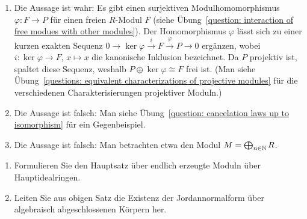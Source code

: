 \begin{solution}
\begin{enumerate}
    \item
      Die Aussage ist wahr:
      Es gibt einen surjektiven Modulhomomorphismus $\varphi \colon F \to P$ für einen freien $R$-Modul $F$ (siehe Übung~\ref{question: interaction of free modues with other modules}).
      Der Homomorphismus $\varphi$ lässt sich zu einer kurzen exakten Sequenz $0 \to \ker \varphi \xrightarrow{i} F \xrightarrow{\varphi} P \to 0$ ergänzen, wobei $i \colon \ker \varphi \to F$, $x \mapsto x$ die kanonische Inklusion bezeichnet.
      Da $P$ projektiv ist, spaltet diese Sequenz, weshalb $P \oplus \ker \varphi \cong F$ frei ist.
      (Man siehe Übung~\ref{questions: equivalent characterizations of projective modules} für die verschiedenen Charakterisierungen projektiver Moduln.)
      
    \item
      Die Aussage ist falsch:
      Man siehe Übung~\ref{question: cancelation laws up to isomorphism} für ein Gegenbeispiel.
      
    \item
      Die Aussage ist falsch:
      Man betrachten etwa den Modul $M = \bigoplus_{n \in \mathbb{N}} R$.
  \end{enumerate}
\end{solution}


\begin{question}
  \begin{enumerate}
    \item
      Formulieren Sie den Hauptsatz über endlich erzeugte Moduln über Hauptidealringen.
    \item
      Leiten Sie aus obigen Satz die Existenz der Jordannormalform über algebraisch abgeschlossenen Körpern her.
  \end{enumerate}
\end{question}


